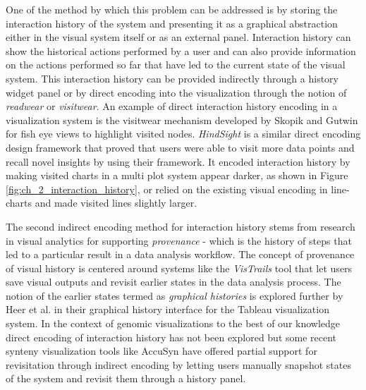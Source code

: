 One of the method by which this problem can be addressed is by storing the interaction history of the system and presenting it as a graphical abstraction either in the visual system itself or as an external panel. Interaction history can show the historical actions performed by a user and can also provide information on the actions performed so far that have led to the current state of the visual system. This interaction history can be provided indirectly through a history widget panel or by direct encoding into the visualization through the notion of \textit{readwear} or \textit{visitwear}. An example of  direct interaction history encoding in a visualization system is the visitwear mechanism developed by Skopik and Gutwin for fish eye views to highlight visited nodes. \textit{HindSight} is a similar direct encoding design framework that proved that users were able to visit more data points and recall novel insights by using their framework\cite{feng2016hindsight}. It encoded interaction history by making visited charts in a multi plot system appear darker, as shown in Figure \ref{fig:ch_2_interaction_history}, or relied on the existing visual encoding in line-charts and made visited lines slightly larger.

The second indirect encoding method for interaction history stems from research in visual analytics for supporting \textit{provenance} - which is the history of steps that led to a particular result in a data analysis workflow\cite{gotz2009characterizing,freire2008provenance}. The concept of provenance of visual history is centered around systems like the \textit{VisTrails} tool\cite{bavoil2005vistrails} that let users save visual outputs and revisit earlier states in the data analysis process. The notion of the earlier states termed as \textit{graphical histories} is explored further by Heer et al.\cite{heer2008graphical} in their graphical history interface for the Tableau visualization system.
In the context of genomic visualizations to the best of our knowledge direct encoding of interaction  history has not been explored but some recent synteny visualization tools like AccuSyn have offered partial support for revisitation through indirect encoding by letting users manually snapshot states of the system and revisit them through a history panel.